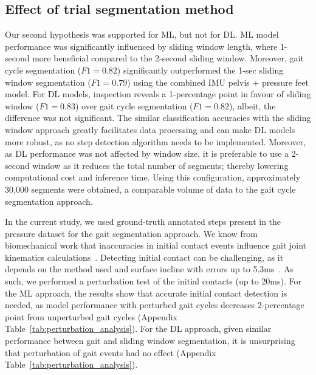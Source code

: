 \documentclass[sensors,article,submit,pdftex,moreauthors]{Definitions/mdpi}
\begin{document}
\subsection{Effect of trial segmentation method}
Our second hypothesis was supported \textcolor{revision}{for ML, but not for DL}. \textcolor{revision2}{ML model performance was significantly influenced by sliding window length, where 1-second more beneficial compared to the 2-second sliding window. Moreover,} gait cycle segmentation ($F1=0.82$) significantly outperformed the \textcolor{revision2}{1-sec} sliding window segmentation ($F1=0.79$) using the combined IMU \textcolor{revision2}{pelvis} + pressure feet model. For DL models, inspection reveals a \textcolor{revision2}{1-percentage point in favour of} sliding window ($F1=0.83$) over gait cycle segmentation ($F1= 0.82$), albeit, the difference was not significant. The similar classification accuracies with the sliding window approach greatly facilitates data processing and can make DL models more robust, as no step detection algorithm needs to be implemented. \textcolor{revision2}{Moreover, as DL performance was not affected by window size, it is preferable to use a 2-second window as it reduces the total number of segments; thereby lowering computational cost and inference time. Using this configuration, approximately 30,000 segments were obtained, a comparable volume of data to the gait cycle segmentation approach.} 

\textcolor{revision2}{In the current study, we used ground-truth annotated steps present in the pressure dataset for the gait segmentation approach. We know from biomechanical work that inaccuracies in initial contact events influence gait joint kinematics calculations~\cite{DUMPHART2026110012}. %
Detecting initial contact can be challenging, as it depends on the method used and surface incline with errors up to 5.3ms~\cite{Blades2023Evaluation}.  }
As such, we performed a perturbation test of the initial contacts (up to 20ms). For the ML approach, the results show that accurate initial contact detection is needed, as  model performance with perturbed gait cycles decreases 2-percentage point from unperturbed gait cycles (Appendix Table~\ref{tab:perturbation_analysis}). \textcolor{revision2}{For the DL approach, given similar performance between gait and sliding window segmentation, it is unsurprising that perturbation of gait events had no effect (Appendix Table~\ref{tab:perturbation_analysis}).}
\end{document}
